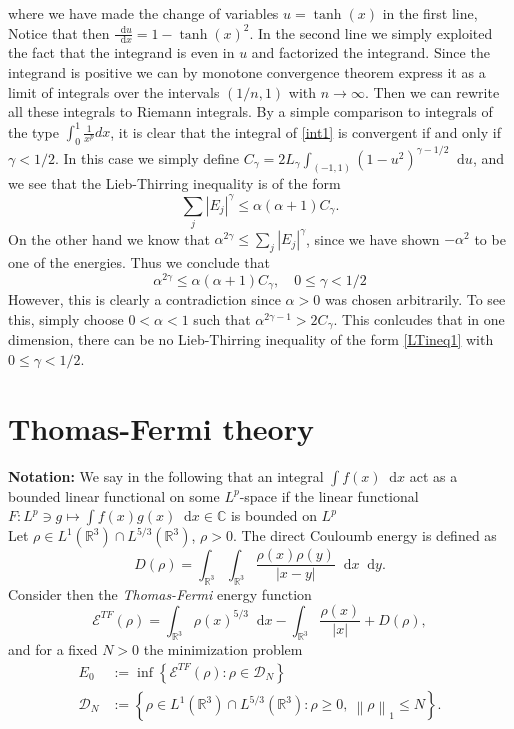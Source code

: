 \documentclass[a4paper,11pt]{article}
\newcommand{\norm}[1]{\left\lVert #1 \right\rVert}
\newcommand{\abs}[1]{\left\lvert #1 \right\rvert}
\newcommand*\diff{\mathop{}\!\mathrm{d}}
\newcommand{\R}{\mathbb{R}}
\newcommand{\C}{\mathbb{C}}
\numberwithin{equation}{section}
\begin{document}
where we have made the change of variables $ u=\tanh(x) $ in the first line, Notice that then $ \frac{\diff u}{\diff x}=1-\tanh(x)^2 $. In the second line we simply exploited the fact that the integrand is even in $ u $ and factorized the integrand. Since the integrand is positive we can by monotone convergence theorem express it as a limit of integrals over the intervals $ (1/n,1) $ with $ n\to \infty $. Then we can rewrite all these integrals to Riemann integrals. By a simple comparison to integrals of the type $ \int_{0}^{1}\frac{1}{x^p}dx $, it is clear that the integral of \eqref{int1} is convergent if and only if $ \gamma<1/2 $. In this case we simply define $ C_\gamma=2L_\gamma\int_{(-1,1)}(1-u^2)^{\gamma-1/2} \diff u $, and we see that the Lieb-Thirring inequality is of the form\begin{equation}
\sum_j\abs{E_j}^\gamma\leq\alpha(\alpha+1)C_\gamma.
\end{equation}
On the other hand we know that $ \alpha^{2\gamma}\leq\sum_j\abs{E_j}^\gamma $, since we have shown $ -\alpha^2 $ to be one of the energies. Thus we conclude that \begin{equation}
\alpha^{2\gamma}\leq\alpha(\alpha+1)C_\gamma,\quad 0\leq \gamma<1/2
\end{equation}
However, this is clearly a contradiction since $ \alpha>0 $ was chosen arbitrarily. To see this, simply choose $ 0<\alpha<1 $ such that  $ \alpha^{2\gamma-1}> 2C_\gamma $. This conlcudes that in one dimension, there can be no Lieb-Thirring inequality of the form \eqref{LTineq1} with $ 0\leq\gamma<1/2 $.
\section{Thomas-Fermi theory}
\textbf{Notation:} We say in the following that an integral $ \int f(x)\diff x $ act as a bounded linear functional on some $ L^p $-space if the linear functional $ F:L^p\ni g\mapsto\int f(x)g(x) \diff x\in\C$ is bounded on $ L^p $\vspace{0.5cm}\\
Let $ \rho\in L^1(\R^3)\cap L^{5/3}(\R^3) $, $ \rho>0 $. The direct Couloumb energy is defined as \begin{equation}
D(\rho)=\int_{\R^3}\int_{\R^3}\frac{\rho(x)\rho(y)}{\abs{x-y}}\diff x\diff y. 
\end{equation}
Consider then the \emph{Thomas-Fermi} energy function \begin{equation}
\mathcal{E}^{TF}(\rho)=\int_{\R^3}\rho(x)^{5/3} \diff x -\int_{\R^3}\frac{\rho(x)}{\abs{x}}+D(\rho),
\end{equation} 
and for a fixed $ N>0 $ the minimization problem \begin{equation}
\begin{aligned}
E_0&:=\inf\left\{\mathcal{E}^{TF}(\rho) : \rho\in\mathcal{D}_N \right\}\\
\mathcal{D}_N&:=\left\{\rho\in L^1(\R^3)\cap L^{5/3}(\R^3) : \rho\geq0,\ \norm{\rho}_1\leq N \right\}.
\end{aligned}
\end{equation}
\end{document}
